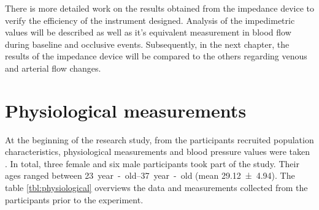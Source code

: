 There is more detailed work on the results obtained from the impedance device to verify the efficiency of the instrument designed. Analysis of the impedimetric values will be described as well as it's equivalent measurement in blood flow during baseline and occlusive events. Subsequently, in the next chapter, the results of the impedance device will be compared to the others regarding venous and arterial flow changes.


\section{Physiological measurements}
\label{section results 1}
At the beginning of the research study, from the participants recruited population characteristics, physiological measurements and blood pressure values were taken . In total, three female and six male participants took part of the study. Their ages ranged between \SIrange{23}{37}{year-old} (mean \num{29.12(494)}). The table \ref{tbl:physiological} overviews the data and measurements collected from the participants prior to the experiment.

